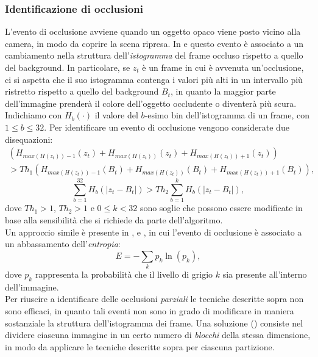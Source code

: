 \subsubsection{Identificazione di occlusioni}
L'evento di occlusione avviene quando un oggetto opaco viene posto vicino alla camera, in modo da coprire la scena ripresa.
In \cite{aksay2007camera} e \cite{saglam2009real} questo evento \`e associato a un cambiamento nella struttura dell'\textit{istogramma} del frame occluso rispetto a quello del background.
In particolare, se $z_t$ \`e un frame in cui \`e avvenuta un'occlusione, ci si aspetta che il suo istogramma contenga i valori pi\`u alti in un intervallo pi\`u ristretto rispetto a quello del background $B_t$, in quanto la maggior parte dell'immagine prender\`a il colore dell'oggetto occludente o diventer\`a pi\`u scura.\\
Indichiamo con $H_b(\cdot)$ il valore del $b$-esimo bin dell'istogramma di un frame, con $1 \leq b \leq 32$.
Per identificare un evento di occlusione vengono considerate due disequazioni:
\begin{eqnarray}
 \left(H_{max\left(H(z_t)\right)-1}(z_t) + H_{max\left(H(z_t)\right)}(z_t) +  H_{max\left(H(z_t)\right) + 1}(z_t)\right) \nonumber \\
 > Th_1 \left(H_{max\left(H(z_t)\right)-1}(B_t) + H_{max\left(H(z_t)\right)}(B_t)
  +  H_{max\left(H(z_t)\right) + 1}(B_t)\right), \nonumber
\end{eqnarray}
\[ \sum_{b=1}^{32} H_b\left(|z_t - B_t|\right) > Th_2 \sum_{b=1}^{k}H_b\left(|z_t - B_t|\right),\]
dove $Th_1 > 1$, $Th_2 > 1$ e $0 \leq k < 32$ sono soglie che possono essere modificate in base alla sensibilit\`a che si richiede da parte dell'algoritmo.\\
Un approccio simile \`e presente in \cite{harasse2004automated}, \cite{gil2007automatic} e \cite{ellwart2012camera}, in cui l'evento di occlusione \`e associato a un abbassamento dell'\textit{entropia}:
 \[
 \label{eq:entropy}
 E=-\sum_{k}p_k\ln(p_k) ,
 \]
 dove $p_k$ rappresenta la probabilit\`a che il livello di grigio $k$ sia presente all'interno dell'immagine. \\
 Per riuscire a identificare delle occlusioni \textit{parziali} le tecniche descritte sopra non sono efficaci, in quanto tali eventi non sono in grado di modificare in maniera sostanziale la struttura dell'istogramma dei frame.
 Una soluzione (\cite{gil2007automatic}) consiste nel dividere ciascuna immagine in un certo numero di \textit{blocchi} della stessa dimensione, in modo da applicare le tecniche descritte sopra per ciascuna partizione.
